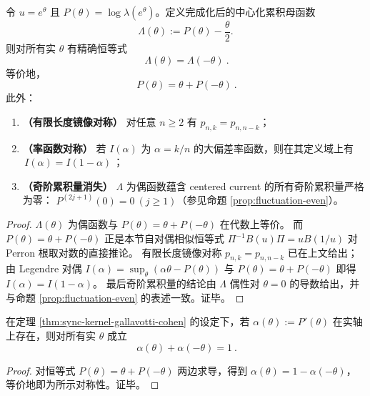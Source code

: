 \begin{theorem}\label{thm:sync-kernel-gallavotti-cohen}
令 \(u=e^{\theta}\) 且 \(P(\theta)=\log\lambda(e^\theta)\)。定义完成化后的中心化累积母函数
\[
\Lambda(\theta):=P(\theta)-\frac{\theta}{2}.
\]
则对所有实 \(\theta\) 有精确恒等式
\[
\boxed{\ \Lambda(\theta)=\Lambda(-\theta)\ }.
\]
等价地，
\[
\boxed{\ P(\theta)=\theta+P(-\theta)\ }.
\]
此外：
\begin{enumerate}
  \item \textbf{（有限长度镜像对称）} 对任意 \(n\ge 2\) 有 \(p_{n,k}=p_{n,n-k}\)；
  \item \textbf{（率函数对称）} 若 \(I(\alpha)\) 为 \(\alpha=k/n\) 的大偏差率函数，则在其定义域上有
  \(\boxed{\,I(\alpha)=I(1-\alpha)\,}\)；
  \item \textbf{（奇阶累积量消失）} \(\Lambda\) 为偶函数蕴含 centered current 的所有奇阶累积量严格为零：
  \(P^{(2j+1)}(0)=0\ (j\ge 1)\)（参见命题 \ref{prop:fluctuation-even}）。
\end{enumerate}
\end{theorem}
\begin{proof}
\(\Lambda(\theta)\) 为偶函数与 \(P(\theta)=\theta+P(-\theta)\) 在代数上等价。
而 \(P(\theta)=\theta+P(-\theta)\) 正是本节自对偶相似恒等式 \(\Pi^{-1}B(u)\Pi=uB(1/u)\) 对 Perron 根取对数的直接推论。
有限长度镜像对称 \(p_{n,k}=p_{n,n-k}\) 已在上文给出；由 Legendre 对偶 \(I(\alpha)=\sup_{\theta}(\alpha\theta-P(\theta))\) 与 \(P(\theta)=\theta+P(-\theta)\) 即得 \(I(\alpha)=I(1-\alpha)\)。
最后奇阶累积量的结论由 \(\Lambda\) 偶性对 \(\theta=0\) 的导数给出，并与命题 \ref{prop:fluctuation-even} 的表述一致。证毕。
\end{proof}

\begin{corollary}[自对偶压力的斜率反演：\texorpdfstring{\(\alpha(\theta)+\alpha(-\theta)=1\)}{alpha(theta)+alpha(-theta)=1}]\label{cor:sync-kernel-gc-slope-involution}
在定理 \ref{thm:sync-kernel-gallavotti-cohen} 的设定下，若 \(\alpha(\theta):=P'(\theta)\) 在实轴上存在，则对所有实 \(\theta\) 成立
\[
\boxed{\ \alpha(\theta)+\alpha(-\theta)=1\ }.
\]
\end{corollary}
\begin{proof}
对恒等式 \(P(\theta)=\theta+P(-\theta)\) 两边求导，得到
\(
\alpha(\theta)=1-\alpha(-\theta)
\)，等价地即为所示对称性。证毕。
\end{proof}

